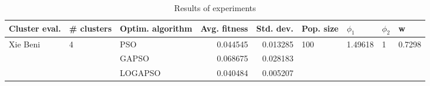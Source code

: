 \begin{table}
\centering
\caption{Results of experiments}
\begin{tabular}{lllrrllll}
\toprule
            Cluster eval. &        \# clusters & Optim. algorithm &  Avg. fitness &  Std. dev. &            Pop. size &               $\phi_{1}$ &         $\phi_{2}$ &                       w \\
\midrule
\multirow{3}{*}{Xie Beni} & \multirow{3}{*}{4} &              PSO &      0.044545 &   0.013285 & \multirow{3}{*}{100} & \multirow{3}{*}{1.49618} & \multirow{3}{*}{1} & \multirow{3}{*}{0.7298} \\
                          &                    &            GAPSO &      0.068675 &   0.028183 &                      &                          &                    &                         \\
                          &                    &          LOGAPSO &      0.040484 &   0.005207 &                      &                          &                    &                         \\
\bottomrule
\end{tabular}
\end{table}
